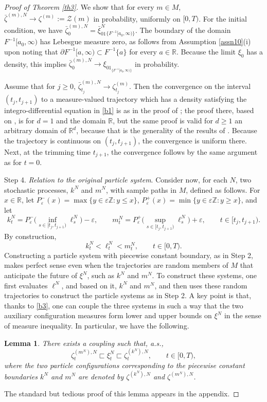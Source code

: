 \documentclass[11pt]{amsart}
\theoremstyle{plain}
\newtheorem{lemma}[theorem]{Lemma}
\newcommand{\eps}{\varepsilon}
\newcommand{\R}{{\mathbb R}}
\newcommand{\Z}{{\mathbb Z}}
\newcommand{\calZ}{{\mathcal Z}}
\newcommand{\pl}{\partial}
\newcommand{\iy}{\infty}
\begin{document}
\begin{proof}[Proof of Theorem \ref{th3}]
We show that for every $m\in M$,
$\bar\zeta^{(m),N}\to\zeta^{(m)}:=\calZ(m)$ in probability,
uniformly on $[0,T)$.
For the initial condition, we have
$\bar\zeta^{(m),N}_0=\bar\xi^N_01_{\{F^{-1}[a_0,\iy)\}}$.
The boundary of the domain $F^{-1}[a_0,\iy)$ has Lebesgue measure
zero, as follows from Assumption \ref{assn10}(i) upon noting that
$\pl F^{-1}[a,\iy)\subset F^{-1}\{a\}$ for every $a\in\R$.
Because the limit $\xi_0$ has a density, this implies
$\bar\zeta^{(m),N}_0\to\xi_01_{\{F^{-1}[a_0,\iy)\}}$ in probability.

Assume that for $j\ge0$, $\bar\zeta^{(m),N}_{t_j}\to\zeta^{(m)}_{t_j}$.
Then the convergence on the interval $(t_j,t_{j+1})$ to a measure-valued
trajectory which has a density satisfying the integro-differential equation
in \eqref{b1} is as in the proof of \cite[Proposition 2.1]{dur11};
the proof there, based on \cite{fou-mel},
is for $d=1$ and the domain $\R$, but the same proof is valid for
$d\ge1$ an arbitrary domain of $\R^d$, because that is
the generality of the results of \cite{fou-mel}. Because the trajectory
is continuous on $(t_j,t_{j+1})$, the convergence is uniform there.
Next, at the trimming time $t_{j+1}$, the convergence follows
by the same argument as for $t=0$.

Step 4.
{\it Relation to the original particle system}.
Consider now, for each $N$, two stochastic processes,
$k^N$ and $m^N$, with sample paths in $M$, defined as follows.
For $x\in\R$, let $P^-_\eps(x)=\max\{y\in\eps\Z:y\le x\}$,
$P^+_\eps(x)=\min\{y\in\eps\Z:y\ge x\}$, and let
\[
k^N_t=
P^-_\eps\Big(\inf_{s\in[t_j,t_{j+1})}\ell^N_s\Big)-\eps,
\qquad
m^N_t=
P^+_\eps\Big(\sup_{s\in[t_j,t_{j+1})}\ell^N_s\Big)+\eps,
\qquad
t\in[t_j,t_{j+1}).
\]
By construction,
\begin{equation}\label{b3}
k^N_t<\ell^N_t<m^N_t, \qquad t\in[0,T).
\end{equation}
Constructing a particle system with piecewise constant boundary,
as in Step 2, makes perfect sense even when the trajectories are random
members of $M$ that anticipate the future of $\xi^N$, such as $k^N$ and $m^N$. To construct these systems,
one first evaluates $\ell^N$, and based on it, $k^N$ and $m^N$,
and then uses these random trajectories
to construct the particle systems as in Step 2.
A key point is that, thanks to \eqref{b3},
one can couple the three systems in such a way that the two auxiliary configuration measures form lower and upper bounds on $\xi^N$ in the sense of measure inequality. In particular, we have the following.
\begin{lemma}\label{lem0a}
There exists a coupling  such that, a.s.,
\begin{equation}\label{b5}
\zeta^{(m^N),N}_t\sqsubset\xi^N_t\sqsubset\zeta^{(k^N),N}_t,
\qquad t\in[0,T),
\end{equation}
where the two particle configurations corresponding to the piecewise constant boundaries $k^N$ and $m^N$ are denoted by $\zeta^{(k^N),N}$ and $\zeta^{(m^N),N}$.
\end{lemma}
The standard but tedious proof of this lemma appears in the appendix.


\end{proof}
\end{document}
